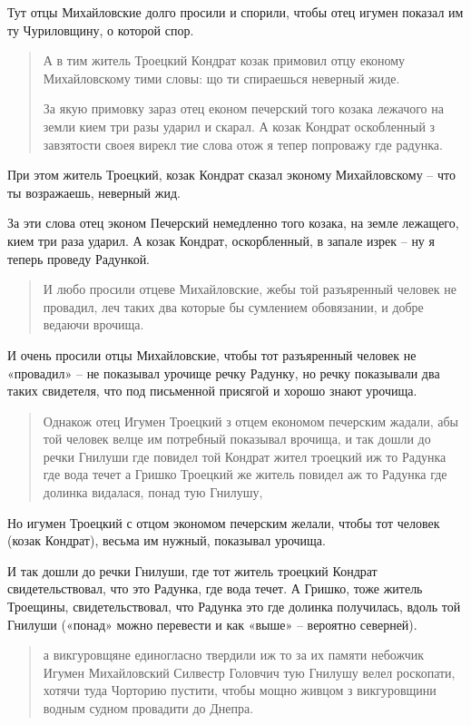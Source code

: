Тут отцы Михайловские долго просили и спорили, чтобы отец игумен показал им ту Чуриловщину, о которой спор.

\begin{quotation}
А в тим житель Троецкий Кондрат козак примовил отцу економу Михайловскому тими словы: що ти спираешься неверный жиде.

За якую примовку зараз отец економ печерский того козака лежачого на земли кием три разы ударил и скарал. А козак Кондрат оскобленный з завзятости своея вирекл тие слова отож я тепер попроважу где радунка.
\end{quotation}

При этом житель Троецкий, козак Кондрат сказал эконому Михайловскому – что ты возражаешь, неверный жид.

За эти слова отец эконом Печерский немедленно того козака, на земле лежащего, кием три раза ударил. А козак Кондрат, оскорбленный, в запале изрек – ну я теперь проведу Радункой.

\begin{quotation}
И любо просили отцеве Михайловские, жебы той разъяренный человек не провадил, леч таких два которые бы сумлением обовязании, и добре ведаючи врочища. 
\end{quotation}

И очень просили отцы Михайловские, чтобы тот разъяренный человек не «провадил» – не показывал урочище речку Радунку, но речку показывали два таких свидетеля, что под письменной присягой и хорошо знают урочища.

\begin{quotation}
Однакож отец Игумен Троецкий з отцем економом печерским жадали, абы той человек велце им потребный показывал врочища, и так дошли до речки Гнилуши где повидел той Кондрат жител троецкий иж то Радунка где вода течет а Гришко Троецкий же житель повидел аж то Радунка где долинка видалася, понад тую Гнилушу, 
\end{quotation}

Но игумен Троецкий с отцом экономом печерским желали, чтобы тот человек (козак Кондрат), весьма им нужный, показывал урочища.

И так дошли до речки Гнилуши, где тот житель троецкий Кондрат свидетельствовал, что это Радунка, где вода течет. А Гришко, тоже житель Троещины, свидетельствовал, что Радунка это где долинка получилась, вдоль той Гнилуши («понад» можно перевести и как «выше» – вероятно северней).

\begin{quotation}
а викгуровщяне единогласно твердили иж то за их памяти небожчик Игумен Михайловский Силвестр Головчич тую Гнилушу велел роскопати, хотячи туда Чорторию пустити, чтобы мощно живцом з викгуровщини водным судном провадити до Днепра.
\end{quotation}

